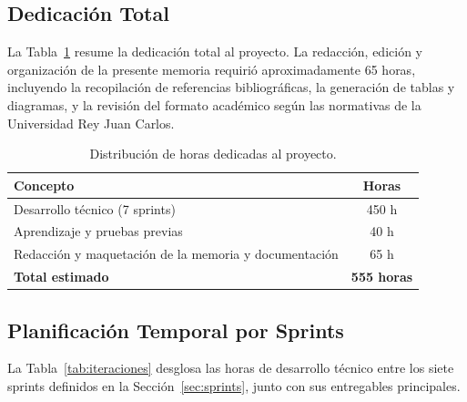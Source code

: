 \subsection{Dedicación Total}

La Tabla~\ref{tab:horas} resume la dedicación total al proyecto. La redacción, edición y organización de la presente memoria requirió aproximadamente 65 horas, incluyendo la recopilación de referencias bibliográficas, la generación de tablas y diagramas, y la revisión del formato académico según las normativas de la Universidad Rey Juan Carlos.

\begin{table}[H]
\centering
\caption{Distribución de horas dedicadas al proyecto.}
\label{tab:horas}
\begin{tabular}{lc}
\toprule
\textbf{Concepto} & \textbf{Horas} \\
\midrule
Desarrollo técnico (7 sprints) & 450 h \\
Aprendizaje y pruebas previas & 40 h \\
Redacción y maquetación de la memoria y documentación & 65 h \\
\midrule
\textbf{Total estimado} & \textbf{555 horas} \\
\bottomrule
\end{tabular}
\end{table}

\subsection{Planificación Temporal por Sprints}

La Tabla~\ref{tab:iteraciones} desglosa las horas de desarrollo técnico entre los siete sprints definidos en la Sección~\ref{sec:sprints}, junto con sus entregables principales.

